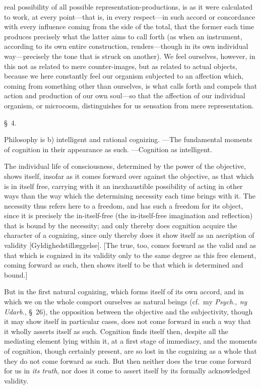\documentclass[12pt,a4paper]{book}
\begin{document}
{real possibility of all possible representation-productions, is as it were
calculated to work, at every point---that is, in every respect---in such accord or
concordance with every influence coming from the side of the total, that the
former each time produces precisely what the latter aims to call forth (as when an
instrument, according to its own entire construction, renders---though in its own
individual way---precisely the tone that is struck on another). We feel ourselves,
however, in this not as related to mere counter-images, but as related to actual
objects, because we here constantly feel our organism subjected to an affection
which, coming from something other than ourselves, is what calls forth and compels
that action and production of our own soul---so that the affection of our
individual organism, or microcosm, distinguishes for us sensation from mere
representation.\par}

\begin{center}\large\S~4.\end{center}
\begin{center}Philosophy is b) intelligent and rational cognizing. ---The fundamental
moments of cognition in their appearance as such. ---Cognition as intelligent.\end{center}

The individual life of consciousness, determined by the power of the objective,
shows itself, insofar as it comes forward over against the objective, as that
which is in itself free, carrying with it an inexhaustible possibility of acting
in other ways than the way which the determining necessity each time brings with
it. The necessity thus refers here to a freedom, and has such a freedom for its
object, since it is precisely the in-itself-free (the in-itself-free imagination
and reflection) that is bound by the necessity; and only thereby does cognition
acquire the character of a cognizing, since only thereby does it show itself as an
ascription of validity [Gyldighedstillæggelse]. [The true, too, comes forward as
the valid and as that which is cognized in its validity only to the same degree as
this free element, coming forward as such, then shows itself to be that which is
determined and bound.]

But in the first natural cognizing, which forms itself of its own accord, and in
which we on the whole comport ourselves as natural beings (cf.\ my
\textit{Psych., ny Udarb.}, \S~26), the opposition between the objective and the
subjectivity, though it may show itself in particular cases, does not come forward
in such a way that it wholly asserts itself as such. Cognition finds itself then,
despite all the mediating element lying within it, at a first stage of immediacy,
and the moments of cognition, though certainly present, are so lost in the
cognizing as a whole that they do not come forward as such. But then neither does
the true come forward for us in \emph{its truth}, nor does it come to assert
itself by its formally acknowledged validity.
\end{document}
